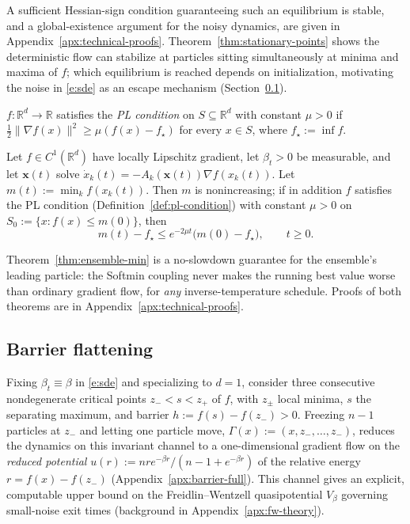 \documentclass{opt2026} %
\newcommand{\prefactor}[2]{A_{#1}(#2)}
\newcommand{\xx}{\mathbf{x}}
\newcommand{\R}{\mathbb{R}}
\begin{document}
A sufficient Hessian-sign condition guaranteeing such an equilibrium is stable, and a global-existence argument for the noisy dynamics, are given in Appendix~\ref{apx:technical-proofs}. Theorem~\ref{thm:stationary-points} shows the deterministic flow can stabilize at particles sitting simultaneously at minima and maxima of $f$; which equilibrium is reached depends on initialization, motivating the noise in \eqref{e:sde} as an escape mechanism (Section~\ref{sec:method-barrier}).

\begin{definition}
    \label{def:pl-condition}
    $f:\R^d\to\R$ satisfies the \emph{PL condition} on $S\subseteq\R^d$ with constant $\mu>0$ if $\tfrac12\|\nabla f(x)\|^2\ge\mu(f(x)-f_\star)$ for every $x\in S$, where $f_\star:=\inf f$.
\end{definition}

\begin{theorem}
    \label{thm:ensemble-min}
    Let $f\in C^1(\R^d)$ have locally Lipschitz gradient, let $\beta_t>0$ be measurable, and let $\xx(t)$ solve $\dot x_k(t)=-\prefactor{k}{\xx(t)}\nabla f(x_k(t))$. Let $m(t):=\min_kf(x_k(t))$. Then $m$ is nonincreasing; if in addition $f$ satisfies the PL condition (Definition~\ref{def:pl-condition}) with constant $\mu>0$ on $S_0:=\{x:f(x)\le m(0)\}$, then
    \[
        m(t)-f_\star\le e^{-2\mu t}\bigl(m(0)-f_\star\bigr), \qquad t\ge0.
    \]
\end{theorem}

Theorem~\ref{thm:ensemble-min} is a no-slowdown guarantee for the ensemble's leading particle: the Softmin coupling never makes the running best value worse than ordinary gradient flow, for \emph{any} inverse-temperature schedule. Proofs of both theorems are in Appendix~\ref{apx:technical-proofs}.

\subsection{Barrier flattening}
\label{sec:method-barrier}

Fixing $\beta_t\equiv\beta$ in \eqref{e:sde} and specializing to $d=1$, consider three consecutive nondegenerate critical points $z_-<s<z_+$ of $f$, with $z_\pm$ local minima, $s$ the separating maximum, and barrier $h:=f(s)-f(z_-)>0$. Freezing $n-1$ particles at $z_-$ and letting one particle move, $\Gamma(x):=(x,z_-,\dots,z_-)$, reduces the dynamics on this invariant channel to a one-dimensional gradient flow on the \emph{reduced potential} $u(r):=nre^{-\beta r}/(n-1+e^{-\beta r})$ of the relative energy $r=f(x)-f(z_-)$ (Appendix~\ref{apx:barrier-full}). This channel gives an explicit, computable upper bound on the Freidlin--Wentzell quasipotential $V_\beta$ governing small-noise exit times \citep{freidlin2012random} (background in Appendix~\ref{apx:fw-theory}).
\end{document}
